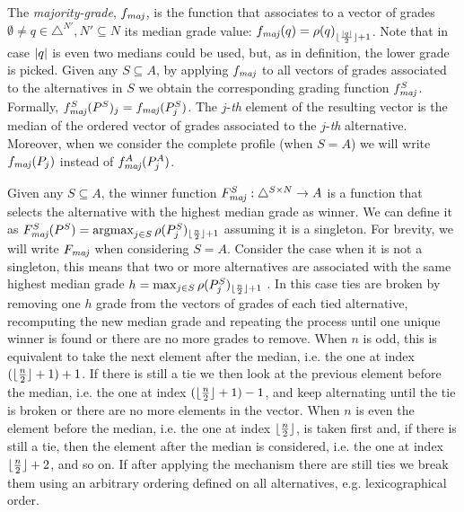 The \emph{majority-grade}, $\fmaj$, is the function that associates to a vector of grades $\emptyset \neq q \in \triangle^{N'}, N' \subseteq N$ its median grade value: $\fmaj(q) = \rho(q)_{\floor{\frac{\card{q}}{2}} + 1}$. Note that in case $\lvert q\rvert$ is even two medians could be used, but, as in \citet{Balinski2011} definition, the lower grade is picked. Given any $S\subseteq A$, by applying $\fmaj$ to all vectors of grades associated to the alternatives in $S$ we obtain the corresponding grading function $\fmaj[S]$. Formally, $\fmaj[S](P^S)_j = \fmaj(P^S_j)$. The $j$-\emph{th} element of the resulting vector is the median of the ordered vector of grades associated to the $j$-\emph{th} alternative. 
Moreover, when we consider the complete profile (when $S=A$) we will write $\fmaj(P_j)$ instead of $\fmaj[A](P^A_j)$.

Given any $S\subseteq A$, the winner function $\Fmaj[S]:\triangle^{S \times N} \rightarrow A$ %
is a function that selects the alternative with the highest median grade as winner. We can define it as $\Fmaj[S](P^S) = \argmax_{j\in S}\rho(P^S_j)_{\floor{\frac{n}{2}}+ 1}$ assuming it is a singleton.  For brevity, we will write $\Fmaj$ when considering $S=A$. Consider the case when it is not a singleton, this means that two or more alternatives are associated with the same highest median grade $h=\max_{j\in S}\rho(P^S_j)_{\lfloor\frac{n}{2}\rfloor + 1}$ . In this case ties are broken by removing one $h$ grade from the vectors of grades of each tied alternative, recomputing the new median grade and repeating the process until one unique winner is found or there are no more grades to remove. When $n$ is odd, this is equivalent to take the next element after the median, i.e. the one at index $(\lfloor\frac{n}{2}\rfloor + 1) +1$. If there is still a tie we then look at the previous element before the median, i.e. the one at index $(\lfloor\frac{n}{2}\rfloor + 1) -1$, and keep alternating until the tie is broken or there are no more elements in the vector. When $n$ is even the element before the median, i.e. the one at index $\lfloor\frac{n}{2}\rfloor$, is taken first and, if there is still a tie, then the element after the median is considered, i.e. the one at index $\lfloor\frac{n}{2}\rfloor + 2$, and so on. If after applying the mechanism there are still ties we break them using an arbitrary ordering defined on all alternatives, e.g. lexicographical order.

